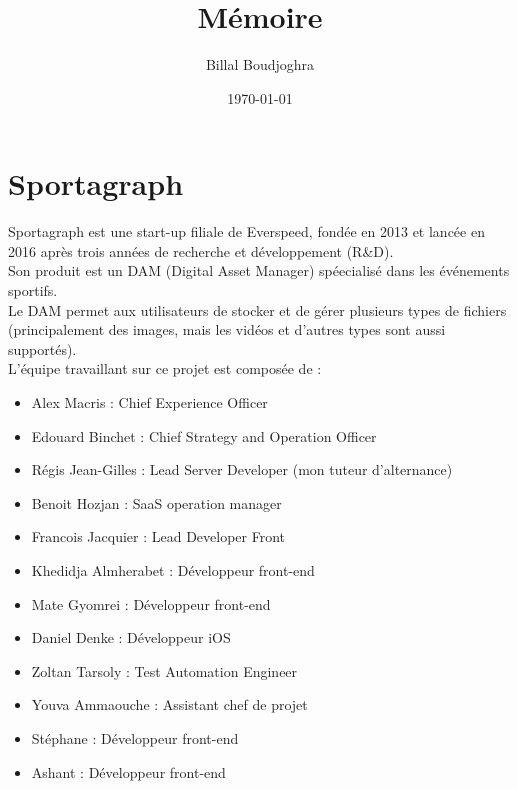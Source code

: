 \documentclass[11pt]{article}
\author{Billal Boudjoghra}
\date{\today}
\title{Mémoire}
\begin{document}
\maketitle
\tableofcontents

\newpage
\section{Sportagraph}
\label{sec:org7ac268c}
Sportagraph est une start-up filiale de Everspeed, fondée en 2013 et lancée en 2016 après trois années de recherche et développement (R\&D).\\
Son produit est un DAM (Digital Asset Manager) spéecialisé dans les événements sportifs.\\

Le DAM permet aux utilisateurs de stocker et de gérer plusieurs types de fichiers (principalement des images, mais les vidéos et d’autres types sont aussi supportés).\\
L’équipe travaillant sur ce projet est composée de :\\
\begin{itemize}
\item Alex Macris : Chief Experience Officer\\
\item Edouard Binchet : Chief Strategy and Operation Officer\\
\item Régis Jean-Gilles : Lead Server Developer (mon tuteur d'alternance)\\
\item Benoit Hozjan : SaaS operation manager\\
\item Francois Jacquier : Lead Developer Front\\
\item Khedidja Almherabet : Développeur front-end\\
\item Mate Gyomrei : Développeur front-end\\
\item Daniel Denke : Développeur iOS\\
\item Zoltan Tarsoly : Test Automation Engineer\\
\item Youva Ammaouche : Assistant chef de projet\\
\item Stéphane : Développeur front-end\\
\item Ashant : Développeur front-end\\
\end{itemize}
\end{document}
